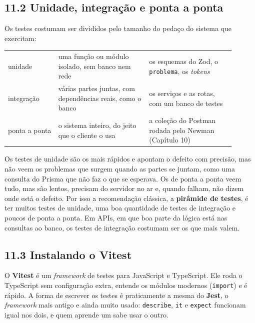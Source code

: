 \subsection{11.2 Unidade, integração e ponta a ponta}

Os testes costumam ser divididos pelo tamanho do pedaço do sistema que exercitam:

\begin{center}
\begin{tabular}{@{}P{0.2\linewidth}P{0.36\linewidth}P{0.34\linewidth}@{}}
\toprule
{}
 &  &  \\
\midrule
unidade & uma função ou módulo isolado, sem banco nem rede & os esquemas do Zod, o \texttt{problema}, os \textit{tokens} \\
 integração & várias partes juntas, com dependências reais, como o banco & os serviços e as rotas, com um banco de testes \\
ponta a ponta & o sistema inteiro, do jeito que o cliente o usa & a coleção do Postman rodada pelo Newman (Capítulo 10) \\
\bottomrule
\end{tabular}
\end{center}

Os testes de unidade são os mais rápidos e apontam o defeito com precisão, mas não veem os problemas que surgem quando as partes se juntam, como uma consulta do Prisma que não faz o que se esperava. Os de ponta a ponta veem tudo, mas são lentos, precisam do servidor no ar e, quando falham, não dizem onde está o defeito. Por isso a recomendação clássica, a \textbf{pirâmide de testes}, é ter muitos testes de unidade, uma boa quantidade de testes de integração e poucos de ponta a ponta. Em APIs, em que boa parte da lógica está nas consultas ao banco, os testes de integração costumam ser os que mais valem.

\subsection{11.3 Instalando o Vitest}

O \textbf{Vitest} é um \textit{framework} de testes para JavaScript e TypeScript. Ele roda o TypeScript sem configuração extra, entende os módulos modernos (\texttt{import}) e é rápido. A forma de escrever os testes é praticamente a mesma do \textbf{Jest}, o \textit{framework} mais antigo e ainda muito usado: \texttt{describe}, \texttt{it} e \texttt{expect} funcionam igual nos dois, e quem aprende um sabe usar o outro.

